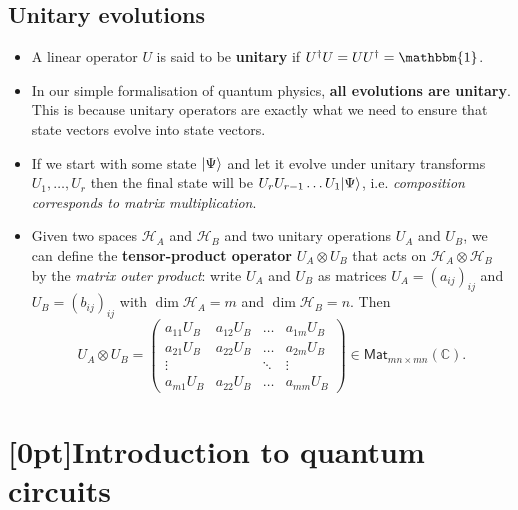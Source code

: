 \documentclass[10pt]{article}
\DeclarePairedDelimiter\ket{\lvert}{\rangle}
\newcommand{\cc}{\mathbb{C}}
\newcommand{\hilb}{\mathcal{H}}
\newcommand{\idm}{\mathbbm{1}}
\newcommand{\QI}{\textcolor{pink}{QI}}
\begin{document}
        \subsection{Unitary evolutions}

            \begin{itemize}
                \item A linear operator $U$ is said to be \textbf{unitary} if $U^\dagger U=UU^\dagger=\idm$.
                \item In our simple formalisation of quantum physics, \textbf{all evolutions are unitary}.
                    This is because unitary operators are exactly what we need to ensure that state vectors evolve into state vectors.
                \item If we start with some state $\ket{\Psi}$ and let it evolve under unitary transforms $U_1,\ldots,U_r$ then the final state will be $U_rU_{r-1}\ldots U_1\ket{\Psi}$, i.e. \emph{composition corresponds to matrix multiplication}.
                \item Given two spaces $\hilb_A$ and $\hilb_B$ and two unitary operations $U_A$ and $U_B$, we can define the \textbf{tensor-product operator} $U_A\otimes U_B$ that acts on $\hilb_A\otimes\hilb_B$ by the \emph{matrix outer product}: write $U_A$ and $U_B$ as matrices $U_A=(a_{ij})_{ij}$ and $U_B=(b_{ij})_{ij}$ with $\dim\hilb_A=m$ and $\dim\hilb_B=n$.
                    Then
                    \begin{equation*}
                        U_A\otimes U_B = \left(
                        \begin{array}{cccc}
                            a_{11}U_B & a_{12}U_B & \ldots & a_{1m}U_B\\
                            a_{21}U_B & a_{22}U_B & \ldots & a_{2m}U_B\\
                            \vdots & & \ddots & \vdots\\
                            a_{m1}U_B & a_{22}U_B & \ldots & a_{mm}U_B
                        \end{array}
                        \right)\in\mathsf{Mat}_{mn\times mn}(\cc).
                    \end{equation*}
            \end{itemize}

    \section{\protect\marginnote{\QI}[0pt]Introduction to quantum circuits}
\end{document}
